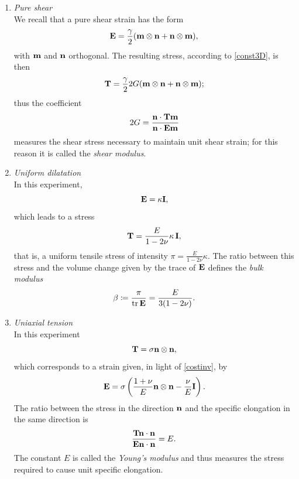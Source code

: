 \vspace{.3cm}

\begin{enumerate}
	\item \textit{Pure shear}\\
	We recall  that a pure shear strain has the form
	\begin{equation}
		\mathbf{E}=\frac{\gamma}{2}(\mathbf{m}\otimes \mathbf{n}+\mathbf{n}\otimes \mathbf{m}),
	\end{equation}
	with $\mathbf{m}$ and $\mathbf{n}$ orthogonal. The resulting stress, according to \eqref{const3D}, is then
	\begin{equation}
		\mathbf{T}=\frac{\gamma}{2}2G(\mathbf{m}\otimes \mathbf{n}+\mathbf{n}\otimes \mathbf{m});
	\end{equation}
	thus the coefficient
	\begin{equation}
		2G=\frac{\mathbf{n} \cdot \mathbf{T} \mathbf{m}}{\mathbf{n} \cdot \mathbf{E} \mathbf{m}}
	\end{equation}
	measures the shear stress necessary to maintain unit shear strain; for this reason it is called the \textit{shear modulus}.
	
	\item \textit{Uniform dilatation}\\
	In this experiment,
	\begin{equation}
		\mathbf{E}=\kappa \mathbf{I},
	\end{equation}
	which leads to a stress
	\begin{equation}
		\mathbf{T}=\frac{E}{1-2\nu}\kappa \,\mathbf{I},
	\end{equation}
	that is, a uniform tensile stress of intensity $\pi=\frac{E}{1-2\nu}\kappa $. The ratio between this stress and the volume change given by the trace of $\mathbf{E}$ defines the \textit{bulk modulus}
	\begin{equation}\label{compr}
		\beta\coloneqq \frac{\pi}{\operatorname{tr}\mathbf{E}}=\frac{E}{3(1-2\nu)}.
	\end{equation}
	
	\item \textit{Uniaxial tension}\\
	In this experiment
	\begin{equation}
		\mathbf{T} = \sigma\mathbf{n} \otimes \mathbf{n},
	\end{equation}
	which corresponds to a strain given, in light of \eqref{costinv}, by
	\begin{equation}
		\mathbf{E}=\sigma\left(\frac{1+\nu}{E}\mathbf{n} \otimes \mathbf{n}-\frac{\nu}{E}\mathbf{I}  \right).
	\end{equation}
	The ratio between the stress in the direction $\mathbf{n}$ and the specific elongation in the same direction is
	\begin{equation}
		\frac{\mathbf{T} \mathbf{n} \cdot \mathbf{n}}{\mathbf{E} \mathbf{n} \cdot \mathbf{n}}=E.
	\end{equation}
	The constant $E$ is called the \textit{Young's modulus} and thus measures the stress required to cause unit specific elongation.
	

\end{enumerate}
